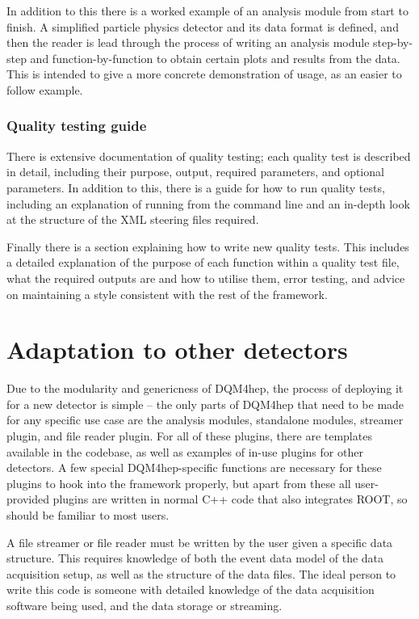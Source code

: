In addition to this there is a worked example of an analysis module from start to finish. A simplified particle physics detector and its data format is defined, and then the reader is lead through the process of writing an analysis module step-by-step and function-by-function to obtain certain plots and results from the data. This is intended to give a more concrete demonstration of usage, as an easier to follow example.

\subsubsection*{Quality testing guide}
There is extensive documentation of quality testing; each quality test is described in detail, including their purpose, output, required parameters, and optional parameters. In addition to this, there is a guide for how to run quality tests, including an explanation of running from the command line and an in-depth look at the structure of the \acrshort{XML} steering files required.

Finally there is a section explaining how to write new quality tests. This includes a detailed explanation of the purpose of each function within a quality test file, what the required outputs are and how to utilise them, error testing, and advice on maintaining a style consistent with the rest of the framework.

\section{Adaptation to other detectors}
Due to the modularity and genericness of \acrshort{DQM4hep}, the process of deploying it for a new detector is simple -- the only parts of \acrshort{DQM4hep} that need to be made for any specific use case are the analysis modules, standalone modules, streamer plugin, and file reader plugin. For all of these plugins, there are templates available in the codebase, as well as examples of in-use plugins for other detectors. A few special \acrshort{DQM4hep}-specific functions are necessary for these plugins to hook into the framework properly, but apart from these all user-provided plugins are written in normal C++ code that also integrates ROOT, so should be familiar to most users.

A file streamer or file reader must be written by the user given a specific data structure. This requires knowledge of both the event data model of the data acquisition setup, as well as the structure of the data files. The ideal person to write this code is someone with detailed knowledge of the data acquisition software being used, and the data storage or streaming. 

